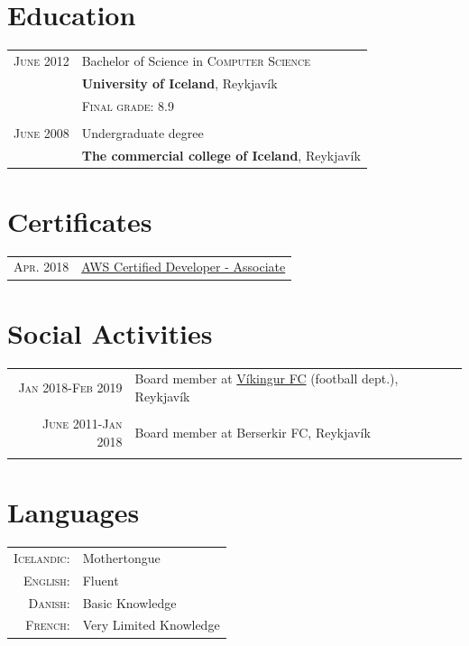 \documentclass[a4paper,10pt]{article}
\begin{document}
\section{Education}
\begin{tabular}{rl}
 \textsc{June} 2012 & Bachelor of Science in \textsc{Computer Science}\\&\textbf{University of Iceland}, Reykjavík\\
&\normalsize \textsc{Final grade}: 8.9\\&\\

 \textsc{June} 2008 & Undergraduate degree\\&\textbf{The commercial college of Iceland}, Reykjavík
\end{tabular}

\section{Certificates}
\begin{tabular}{rl}
 \textsc{Apr.} 2018 & \href{https://aws.amazon.com/certification/certified-developer-associate/}{AWS Certified Developer - Associate}
\end{tabular}



\section{Social Activities}
\begin{tabular}{r|p{10cm}}

 \textsc{Jan 2018-Feb 2019} & Board member at \href{www.vikingur.is}{Víkingur FC} (football dept.), Reykjavík \\\multicolumn{2}{c}{} \\

 \textsc{June 2011-Jan 2018} & Board member at Berserkir FC, Reykjavík \\\multicolumn{2}{c}{} \\

\end{tabular}
\section{Languages}
\begin{tabular}{rl}
 \textsc{Icelandic:}&Mothertongue\\
\textsc{English:}&Fluent\\
\textsc{Danish:}&Basic Knowledge\\
\textsc{French:}&Very Limited Knowledge\\
\end{tabular}
\end{document}
